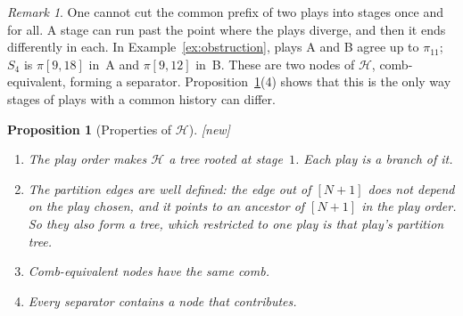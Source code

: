 \documentclass[11pt]{article}
\newcommand{\iv}[2]{\pi[#1,#2]}
\newcommand{\New}{\textsf{[new]}}
\theoremstyle{plain}
\newtheorem{proposition}[theorem]{Proposition}
\theoremstyle{definition}
\theoremstyle{remark}
\newtheorem{remark}[theorem]{Remark}
\begin{document}
\begin{remark}
One cannot cut the common prefix of two plays into stages once and
for all.  A stage can run past the point where the plays diverge, and
then it ends differently in each.  In Example~\ref{ex:obstruction},
plays A and B agree up to $\pi_{11}$; $S_4$ is $\iv9{18}$ in~A and
$\iv9{12}$ in~B.  These are two nodes of $\mathcal H$, comb-equivalent,
forming a separator.  Proposition~\ref{prop:hyper}(4) shows that this
is the only way stages of plays with a common history can differ.
\end{remark}

\begin{proposition}[Properties of $\mathcal H$]\label{prop:hyper}
\New{}
\begin{enumerate}
\item The play order makes $\mathcal H$ a tree rooted at stage~$1$.
  Each play is a branch of it.
\item The partition edges are well defined: the edge out of $[N+1]$
  does not depend on the play chosen, and it points to an ancestor of
  $[N+1]$ in the play order.  So they also form a tree, which
  restricted to one play is that play's partition tree.
\item Comb-equivalent nodes have the same comb.
\item Every separator contains a node that contributes.
\end{enumerate}
\end{proposition}
\end{document}
